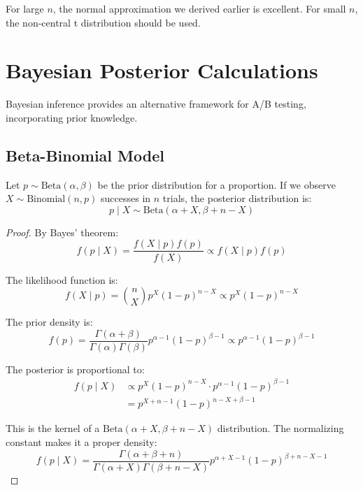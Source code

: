 \begin{remark}
For large $n$, the normal approximation we derived earlier is excellent. For small $n$, the non-central t distribution should be used.
\end{remark}

\section{Bayesian Posterior Calculations}

Bayesian inference provides an alternative framework for A/B testing, incorporating prior knowledge.

\subsection{Beta-Binomial Model}

\begin{theorem}
Let $p \sim \text{Beta}(\alpha, \beta)$ be the prior distribution for a proportion. If we observe $X \sim \text{Binomial}(n, p)$ successes in $n$ trials, the posterior distribution is:
\begin{equation}
p \mid X \sim \text{Beta}(\alpha + X, \beta + n - X)
\end{equation}
\end{theorem}

\begin{proof}
By Bayes' theorem:
\begin{equation}
f(p \mid X) = \frac{f(X \mid p) f(p)}{f(X)} \propto f(X \mid p) f(p)
\end{equation}

The likelihood function is:
\begin{equation}
f(X \mid p) = \binom{n}{X} p^X(1-p)^{n-X} \propto p^X(1-p)^{n-X}
\end{equation}

The prior density is:
\begin{equation}
f(p) = \frac{\Gamma(\alpha + \beta)}{\Gamma(\alpha)\Gamma(\beta)} p^{\alpha-1}(1-p)^{\beta-1} \propto p^{\alpha-1}(1-p)^{\beta-1}
\end{equation}

The posterior is proportional to:
\begin{align}
f(p \mid X) &\propto p^X(1-p)^{n-X} \cdot p^{\alpha-1}(1-p)^{\beta-1} \\
&= p^{X+\alpha-1}(1-p)^{n-X+\beta-1}
\end{align}

This is the kernel of a $\text{Beta}(\alpha + X, \beta + n - X)$ distribution. The normalizing constant makes it a proper density:
\begin{equation}
f(p \mid X) = \frac{\Gamma(\alpha + \beta + n)}{\Gamma(\alpha + X)\Gamma(\beta + n - X)} p^{\alpha+X-1}(1-p)^{\beta+n-X-1}
\end{equation}
\end{proof}

